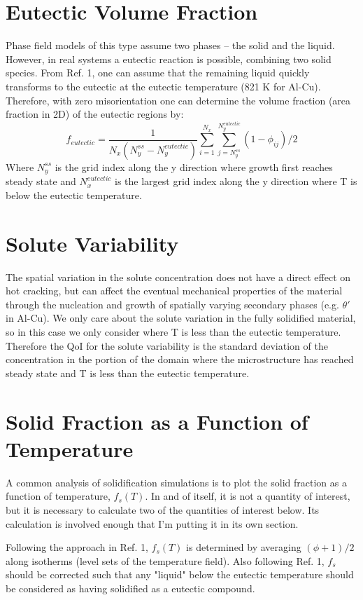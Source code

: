 \documentclass[11pt]{article}
\begin{document}
\section{Eutectic Volume Fraction}
Phase field models of this type assume two phases -- the solid and the liquid. However, in real systems a eutectic reaction is possible, combining two solid species. From Ref. 1, one can assume that the remaining liquid quickly transforms to the eutectic at the eutectic temperature (821 K for Al-Cu). Therefore, with zero misorientation one can determine the volume fraction (area fraction in 2D) of the eutectic regions by:
\begin{equation}
f_{eutectic} = \frac{1}{N_x (N_y^{ss} - N_y^{eutectic})} \sum_{i=1}^{N_x} \sum_{j=N_y^{ss}}^{N_y^{eutectic}}  (1-\phi_{ij})/2
\end{equation}
Where $N_y^{ss}$ is the grid index along the y direction where growth first reaches steady state and $N_x^{eutectic}$ is the largest grid index along the y direction where T is below the eutectic temperature.

\section{Solute Variability}
The spatial variation in the solute concentration does not have a direct effect on hot cracking, but can affect the eventual mechanical properties of the material through the nucleation and growth of spatially varying secondary phases (e.g. $\theta'$ in Al-Cu). We only care about the solute variation in the fully solidified material, so in this case we only consider where T is less than the eutectic temperature. Therefore the QoI for the solute variability is the standard deviation of the concentration in the portion of the domain where the microstructure has reached steady state and T is less than the eutectic temperature.

\section{Solid Fraction as a Function of Temperature}
A common analysis of solidification simulations is to plot the solid fraction as a function of temperature, $f_s(T)$. In and of itself, it is not a quantity of interest, but it is necessary to calculate two of the quantities of interest below. Its calculation is involved enough that I'm putting it in its own section.

Following the approach in Ref. 1,  $f_s(T)$ is determined by averaging $(\phi+1)/2$ along isotherms (level sets of the temperature field). Also following Ref. 1, $f_s$ should be corrected such that any "liquid" below the eutectic temperature should be considered as having solidified as a eutectic compound.
\end{document}
